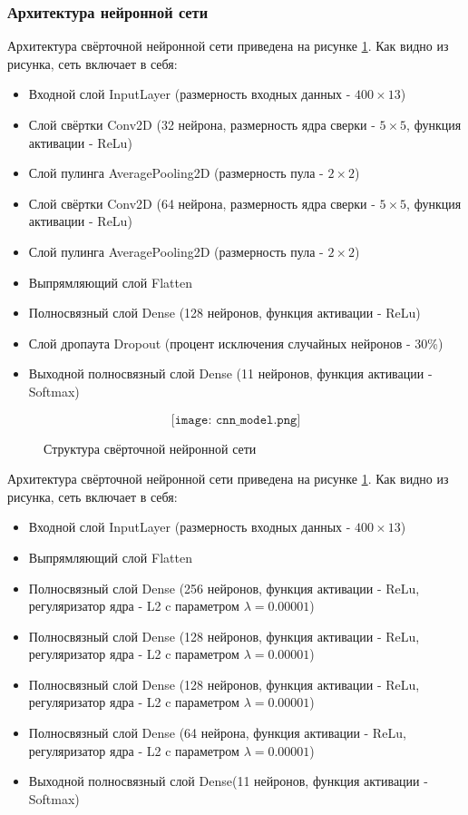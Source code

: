 \subsubsection{Архитектура нейронной сети}
Архитектура свёрточной нейронной сети приведена на рисунке \ref{fig:cnn_model}. Как видно из рисунка, сеть включает в себя:
\begin{itemize}[leftmargin=2cm]
	\item Входной слой InputLayer (размерность входных данных - $400 \times 13$)
	\item Слой свёртки Conv2D (32 нейрона, размерность ядра сверки - $5 \times 5$, функция активации - ReLu)
	\item Слой пулинга AveragePooling2D (размерность пула - $2 \times 2$)
	\item Слой свёртки Conv2D (64 нейрона, размерность ядра сверки - $5 \times 5$, функция активации - ReLu)
	\item Слой пулинга AveragePooling2D (размерность пула - $2 \times 2$)
	\item Выпрямляющий слой Flatten
	\item Полносвязный слой Dense (128 нейронов, функция активации - ReLu)
	\item Слой дропаута Dropout (процент исключения случайных нейронов  - 30\%)
	\item Выходной полносвязный слой Dense (11 нейронов, функция активации - Softmax)
\end{itemize}

\begin{figure}[H]
	\[\texttt{[image: cnn\_model.png]}\]
	\caption{Структура свёрточной нейронной сети}
	\label{fig:cnn_model}
\end{figure}

Архитектура свёрточной нейронной сети приведена на рисунке \ref{fig:cnn_model}. Как видно из рисунка, сеть включает в себя:
\begin{itemize}[leftmargin=2cm]
	\item Входной слой InputLayer (размерность входных данных - $400 \times 13$)
	\item Выпрямляющий слой Flatten
	\item Полносвязный слой Dense (256 нейронов, функция активации - ReLu, регуляризатор ядра - L2 c параметром $\lambda = 0.00001$)
	\item Полносвязный слой Dense (128 нейронов, функция активации - ReLu, регуляризатор ядра - L2 c параметром $\lambda = 0.00001$)
	\item Полносвязный слой Dense (128 нейронов, функция активации - ReLu, регуляризатор ядра - L2 c параметром $\lambda = 0.00001$)
	\item Полносвязный слой Dense (64 нейрона, функция активации - ReLu, регуляризатор ядра - L2 c параметром $\lambda = 0.00001$)
	\item Выходной полносвязный слой Dense(11 нейронов, функция активации - Softmax)
\end{itemize}

